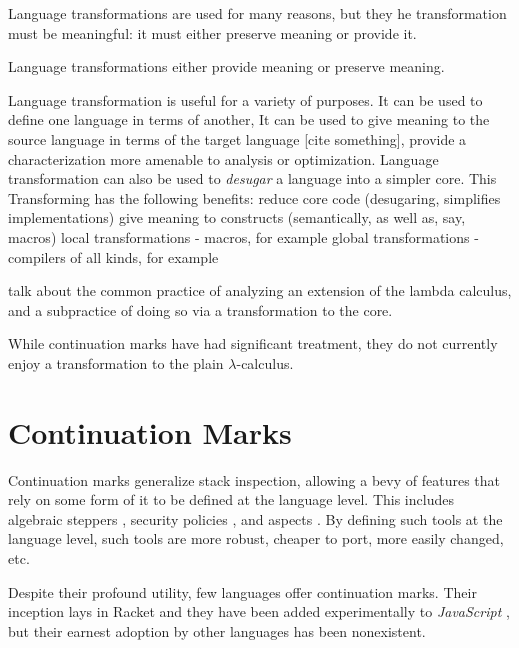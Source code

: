 \documentclass{llncs}
\begin{document}
Language transformations are used for many reasons, but they he transformation must be meaningful: it must either preserve meaning or provide it.

Language transformations either provide meaning or preserve meaning.

Language transformation is useful for a variety of purposes. It can be used to define one language in terms of another, It can be used to give meaning to the source language in terms of the target language [cite something], provide a characterization more amenable to analysis or optimization. Language transformation can also be used to \emph{desugar} a language into a simpler core. This 
Transforming has the following benefits:
reduce core code (desugaring, simplifies implementations)
give meaning to constructs (semantically, as well as, say, macros)
local transformations - macros, for example
global transformations - compilers of all kinds, for example

talk about the common practice of analyzing an extension of the lambda calculus, and a subpractice of doing so via a transformation to the core.

While continuation marks have had significant treatment, they do not currently enjoy a transformation to the plain $\lambda$-calculus.

\section{Continuation Marks}

Continuation marks generalize stack inspection, allowing a bevy of features that rely on some form of it to be defined at the language level. This includes algebraic steppers \cite{clements2001modeling}, security policies \cite{clements2004tail}, and aspects \cite{tucker2003pointcuts}. By defining such tools at the language level, such tools are more robust, cheaper to port, more easily changed, etc.

Despite their profound utility, few languages offer continuation marks. Their inception lays in Racket \cite{plt-tr1} and they have been added experimentally to \emph{JavaScript} \cite{clements2008implementing}, but their earnest adoption by other languages has been nonexistent.


\end{document}
